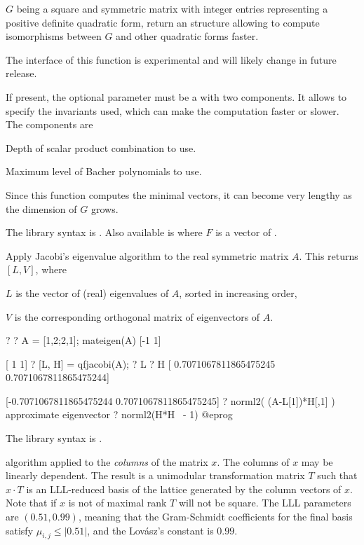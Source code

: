 \label{se:qfisominit}
$G$ being a square and symmetric matrix with integer entries representing a
positive definite quadratic form, return an  structure allowing to
compute isomorphisms between $G$ and other quadratic forms faster.

The interface of this function is experimental and will likely change in future
release.

If present, the optional parameter  must be a  with two
components. It allows to specify the invariants used, which can make the
computation faster or slower. The components are

\item {} Depth of scalar product combination to use.

\item {} Maximum level of Bacher polynomials to use.

Since this function computes the minimal vectors, it can become very lengthy
as the dimension of $G$ grows.

The library syntax is .
Also available is
where $F$ is a vector of .

\label{se:qfjacobi}
Apply Jacobi's eigenvalue algorithm to the real symmetric matrix $A$.
This returns $[L, V]$, where

\item $L$ is the vector of (real) eigenvalues of $A$, sorted in increasing
order,

\item $V$ is the corresponding orthogonal matrix of eigenvectors of $A$.

\bprog
? 
? A = [1,2;2,1]; mateigen(A)
[-1 1]

[ 1 1]
? [L, H] = qfjacobi(A);
? L
? H
[ 0.7071067811865475245 0.7071067811865475244]

[-0.7071067811865475244 0.7071067811865475245]
? norml2( (A-L[1])*H[,1] )       \\ approximate eigenvector
? norml2(H*H~ - 1)
@eprog

The library syntax is .

\label{se:qflll}
 algorithm applied to the
\emph{columns} of the matrix $x$. The columns of $x$ may be linearly
dependent. The result is a unimodular transformation matrix $T$ such that $x
\cdot T$ is an LLL-reduced basis of the lattice generated by the column
vectors of $x$. Note that if $x$ is not of maximal rank $T$ will not be
square. The LLL parameters are $(0.51,0.99)$, meaning that the Gram-Schmidt
coefficients for the final basis satisfy $\mu_{i,j} \leq |0.51|$, and the
Lov\'{a}sz's constant is $0.99$.

